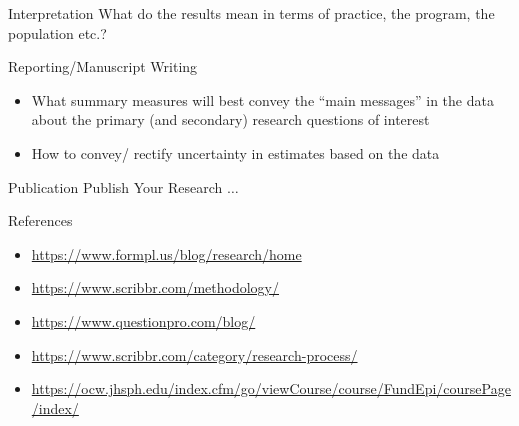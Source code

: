 \begin{frame}[t]{Interpretation}
	What do the results mean in terms of practice, the program,
	the population etc.?
\end{frame}

\begin{frame}[t]{Reporting/Manuscript Writing}
	\begin{itemize}
		\item What summary measures will best convey the “main messages”
		in the data about the primary (and secondary) research
		questions of interest
		\item How to convey/ rectify uncertainty in estimates based on the
		data
	\end{itemize}
\end{frame}
\begin{frame}[t]{Publication}
	\vfill
	\centering \LARGE Publish Your Research $\dots$
\end{frame}


\begin{frame}[t]{References}
	\begin{itemize}
		\item \url{https://www.formpl.us/blog/research/home}
		\item \url{https://www.scribbr.com/methodology/}
		\item \url{https://www.questionpro.com/blog/}
		\item \url{https://www.scribbr.com/category/research-process/}
		\item 
		\url{https://ocw.jhsph.edu/index.cfm/go/viewCourse/course/FundEpi/coursePage/index/}
	\end{itemize}
\end{frame}

